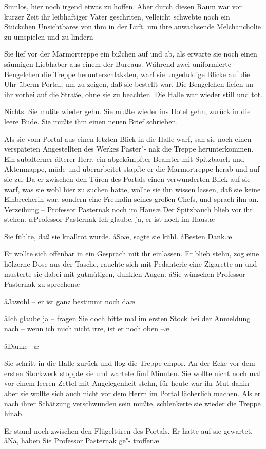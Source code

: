 Sinnlos, hier noch irgend etwas zu hoffen. Aber durch diesen
Raum war vor kurzer Zeit ihr leibhaftiger Vater geschriten,
velleicht schwebte noch ein Stückchen Unsichtbares von ihm
in der Luft, um ihre anwachsende Melchancholie zu umspielen
und zu lindern\frag{}

Sie lief vor der Marmortreppe ein bißchen auf und ab, als
erwarte sie noch einen säumigen Liebhaber aus einem der
Bureaus. Während zwei uniformierte Bengelchen die Treppe
herunterschlaksten, warf sie ungeduldige Blicke auf die Uhr
überm Portal, um zu zeigen, daß sie bestellt war. Die
Bengelchen liefen an ihr vorbei auf die Straße, ohne sie zu
beachten. Die Halle war wieder still und tot.

Nichts. Sie mußte wieder gehn. Sie mußte wieder ins Hotel
gehn, zurück in die leere Bude. Sie mußte ihm einen neuen
Brief schrieben.

Als sie vom Portal aus einen letzten Blick in die Halle warf,
sah sie noch einen verspäteten Angestellten des Werkes Paster"-%
nak die Treppe herunterkommen. Ein subalterner älterer Herr,
ein abgekämpfter Beamter mit Spitzbauch und Aktenmappe,
müde und überarbeitet stapfte er die Marmortreppe herab
und auf sie zu. Da er zwischen den Türen des Portals einen
verwunderten Blick auf sie warf, was sie wohl hier zu suchen
hätte, wollte sie ihn wissen lassen, daß sie keine Einbrecherin
war, sondern eine Freundin seines großen Chefs, und sprach
ihn an. \aanah{}Verzeihung -- Professor Pasternak noch im Haus\frag{}\ae{}
Der Spitzbauch blieb vor ihr stehen. \ae{}Professor Pasternak\frag{}
Ich glaube, ja, er ist noch im Haus.\ae{}

Sie fühlte, daß sie knallrot wurde. \aa{}So\frag{}\ae{}, sagte sie kühl.
\aa{}Besten Dank.\ae{}

Er wollte sich offenbar in ein Gespräch mit ihr einlassen. Er
blieb stehn, zog eine hölzerne Dose aus der Tasche, rauchte
sich mit Pedanterie eine Zigarette an und musterte sie dabei
mit gutmütigen, dunklen Augen. \aa{}Sie wünschen Professor
Pasternak zu sprechen\frag{}\ae{}

\aa{}Jawohl -- er ist ganz bestimmt noch da\frag{}\ae{}

\aa{}Ich glaube ja -- fragen Sie doch bitte mal im ersten Stock bei der
Anmeldung nach -- wenn ich mich nicht irre, ist er noch oben --\ae{}

\aa{}Danke --\ae{}

Sie schritt in die Halle zurück und flog die Treppe empor.
An der Ecke vor dem ersten Stockwerk stoppte sie und wartete
fünf Minuten. Sie wollte nicht noch mal vor einem leeren
Zettel mit \haa{}Angelegenheit\hae{} stehn, für heute war ihr Mut
dahin\dopp{} aber sie wollte sich auch nicht vor dem Herrn im Portal
lächerlich machen. Als er nach ihrer Schätzung verschwunden
sein mußte, schlenkerte sie wieder die Treppe hinab.

Er stand noch zwischen den Flügeltüren des Portals. Er hatte
auf sie gewartet. \aa{}Na, haben Sie Professor Pasternak ge"-%
troffen\frag{}\ae{}

